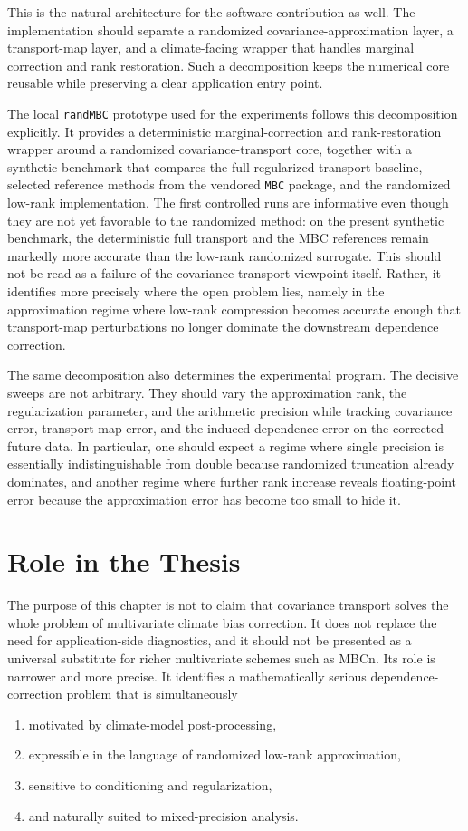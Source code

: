 This is the natural architecture for the software contribution as well. The implementation should separate a randomized covariance-approximation layer, a transport-map layer, and a climate-facing wrapper that handles marginal correction and rank restoration. Such a decomposition keeps the numerical core reusable while preserving a clear application entry point.

The local \texttt{randMBC} prototype used for the experiments follows this decomposition explicitly. It provides a deterministic marginal-correction and rank-restoration wrapper around a randomized covariance-transport core, together with a synthetic benchmark that compares the full regularized transport baseline, selected reference methods from the vendored \texttt{MBC} package, and the randomized low-rank implementation. The first controlled runs are informative even though they are not yet favorable to the randomized method: on the present synthetic benchmark, the deterministic full transport and the MBC references remain markedly more accurate than the low-rank randomized surrogate. This should not be read as a failure of the covariance-transport viewpoint itself. Rather, it identifies more precisely where the open problem lies, namely in the approximation regime where low-rank compression becomes accurate enough that transport-map perturbations no longer dominate the downstream dependence correction.

The same decomposition also determines the experimental program. The decisive sweeps are not arbitrary. They should vary the approximation rank, the regularization parameter, and the arithmetic precision while tracking covariance error, transport-map error, and the induced dependence error on the corrected future data. In particular, one should expect a regime where single precision is essentially indistinguishable from double because randomized truncation already dominates, and another regime where further rank increase reveals floating-point error because the approximation error has become too small to hide it.

\section{Role in the Thesis}

The purpose of this chapter is not to claim that covariance transport solves the whole problem of multivariate climate bias correction. It does not replace the need for application-side diagnostics, and it should not be presented as a universal substitute for richer multivariate schemes such as MBCn. Its role is narrower and more precise. It identifies a mathematically serious dependence-correction problem that is simultaneously
\begin{enumerate}
	\item motivated by climate-model post-processing,
	\item expressible in the language of randomized low-rank approximation,
	\item sensitive to conditioning and regularization,
	\item and naturally suited to mixed-precision analysis.
\end{enumerate}

